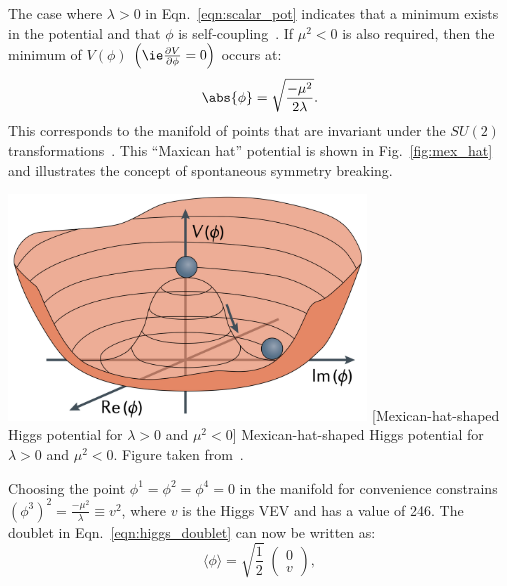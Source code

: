 The case where $\lambda > 0$ in Eqn.~\ref{eqn:scalar_pot} indicates that a minimum exists in the potential and that $\phi$ is self-coupling~\cite{bass_higgs_2021}.
If $\mu^2 < 0$ is also required, then the minimum of $V(\phi)$ $\left( \ie \frac{\partial V}{\partial \phi} = 0 \right)$ occurs at:
\begin{equation}
    \abs{\phi} = \sqrt{ \frac{-\mu^2}{2\lambda} }.
    \label{eqn:higgs_min}
\end{equation}
This corresponds to the manifold of points that are invariant under the $SU(2)$ transformations~\cite{Halzen:1984mc}.
This ``Maxican hat'' potential is shown in Fig.~\ref{fig:mex_hat} and illustrates the concept of spontaneous symmetry breaking.
\begin{multiFigure}
    \centering
    \includegraphics[height=6cm,keepaspectratio]{figures/sm/higgs_potential.png}
        [Mexican-hat-shaped Higgs potential for $\lambda > 0$ and $\mu^2 < 0$]
        {Mexican-hat-shaped Higgs potential for $\lambda > 0$ and $\mu^2 < 0$.
        Figure taken from~\cite{bass_higgs_2021}.} 
    \label{fig:mex_hat}
\end{multiFigure}
Choosing the point $\phi^1 = \phi^2 = \phi^4 = 0$ in the manifold for convenience constrains $\left(\phi^3\right)^2 = \frac{-\mu^2}{\lambda} \equiv v^2$,
where $v$ is the Higgs VEV and has a value of 246\GeV. %
The doublet in Eqn.~\ref{eqn:higgs_doublet} can now be written as:
\begin{equation*}
    \langle\phi\rangle = \sqrt{\frac{1}{2}}
    \hspace{3pt}
    \begin{pmatrix}
        0 
        \\
        v 
    \end{pmatrix},
\end{equation*}
